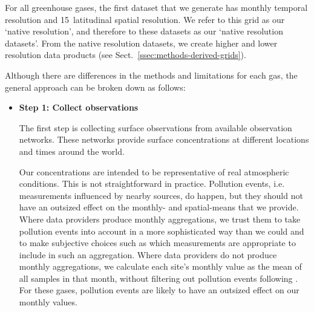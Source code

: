 For all greenhouse gases, the first dataset
that we generate has monthly temporal resolution and 15\textdegree~latitudinal spatial resolution.
We refer to this grid as our `native resolution', and therefore to these datasets
as our `native resolution datasets'.
From the native resolution datasets, we create higher and lower resolution data products
(see Sect.~\ref{ssec:methods-derived-grids}).

Although there are differences in the methods and limitations for each gas, the general approach can
be broken down as follows:

\begin{itemize}
    \item {
        \textbf{Step 1: Collect observations}

        The first step is collecting surface observations from available observation networks.
        These networks provide surface concentrations at different locations and times around the world.

        Our concentrations are intended to be representative of real atmospheric conditions.
        This is not straightforward in practice.
        Pollution events, i.e. measurements influenced by nearby sources, do happen,
        but they should not have an outsized effect on the monthly- and spatial-means that we provide.
        Where data providers produce monthly aggregations,
        we trust them to take pollution events into account in a more sophisticated way than we could
        and to make subjective choices such as which measurements are appropriate to include in such an aggregation.
        Where data providers do not produce monthly aggregations,
        we calculate each site's monthly value as the mean of all samples in that month,
        without filtering out pollution events following \citet{meinshausen_historical-ghgs_2017}.
        For these gases, pollution events are likely to have an outsized effect on our monthly values.

}
\end{itemize}
